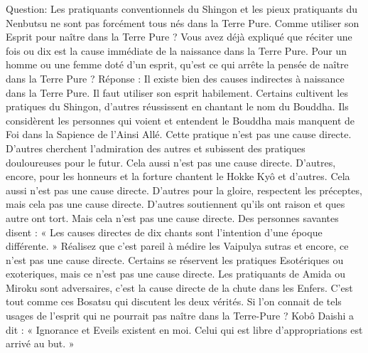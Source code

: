 Question: Les pratiquants conventionnels du Shingon et les pieux pratiquants du Nenbutsu ne sont pas forcément tous nés dans la Terre Pure. Comme utiliser son Esprit pour naître dans la Terre Pure ? Vous avez déjà expliqué que réciter une fois ou dix est la cause immédiate de la naissance dans la Terre Pure. Pour un homme ou une femme doté d’un esprit, qu’est ce qui arrête la pensée de naître dans la Terre Pure ?
Réponse : Il existe bien des causes indirectes à naissance dans la Terre Pure. Il faut utiliser son esprit habilement. Certains cultivent les pratiques du Shingon, d’autres réussissent en chantant le nom du Bouddha. Ils considèrent les personnes qui voient et entendent le Bouddha mais manquent de Foi dans la Sapience de l’Ainsi Allé. Cette pratique n’est pas une cause directe. D’autres cherchent l’admiration des autres et subissent des pratiques douloureuses pour le futur. Cela aussi n’est pas une cause directe. D’autres, encore, pour les honneurs et la forture chantent le Hokke Kyô et d’autres. Cela aussi n’est pas une cause directe. D’autres pour la gloire, respectent les préceptes, mais cela pas une cause directe. D’autres soutiennent qu’ils ont raison et ques autre ont tort. Mais cela n’est pas une cause directe. Des personnes savantes disent : « Les causes directes de dix chants sont l’intention d’une époque différente. »
Réalisez que c’est pareil à médire les Vaipulya sutras et encore, ce n’est pas une cause directe. Certains se réservent les pratiques Esotériques ou exoteriques, mais ce n’est pas une cause directe.
Les pratiquants de Amida ou Miroku sont adversaires, c’est la cause directe de la chute dans les Enfers. C’est tout comme ces Bosatsu qui discutent les deux vérités. Si l’on connait de tels usages de l’esprit qui ne pourrait pas naître dans la Terre-Pure ?
Kobô Daishi a dit : « Ignorance et Eveils existent en moi. Celui qui est libre d'appropriations est arrivé au but. »

